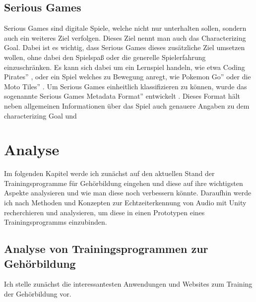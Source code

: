 \section{Serious Games}
Serious Games sind digitale Spiele, welche nicht nur unterhalten sollen, sondern auch ein weiteres Ziel verfolgen. Dieses Ziel nennt man auch das Characterizing Goal. Dabei ist es wichtig, dass Serious Games dieses zusätzliche Ziel umsetzen wollen, ohne dabei den Spielspaß oder die generelle Spielerfahrung einzuschränken. Es kann sich dabei um ein Lernspiel handeln, wie etwa \glqq Coding Pirates'' \cite{coding_game}, oder ein Spiel welches zu Bewegung anregt, wie \glqq Pokemon Go''\cite{althoff2016influence} oder die \glqq Moto Tiles'' \cite{liu2018playful}. Um Serious Games einheitlich klassifizieren zu können, wurde das sogenannte \glqq Serious Games Metadata Format'' entwickelt \cite{gobel2011makes}. Dieses Format hält neben allgemeinen Informationen über das Spiel auch genauere Angaben zu dem characterizing Goal und

\chapter{Analyse}

%
%
Im folgenden Kapitel werde ich zunächst auf den aktuellen Stand der Trainingsprogramme für Gehörbildung eingehen und diese auf ihre wichtigsten Aspekte analysieren und wie man diese noch verbessern könnte. Daraufhin werde ich nach Methoden und Konzepten zur Echtzeiterkennung von Audio mit Unity recherchieren und analysieren, um diese in einen Prototypen eines Trainingsprogramms einzubinden.

\section{Analyse von Trainingsprogrammen zur Gehörbildung}
Ich stelle zunächst die interessantesten Anwendungen und Websites zum Training der Gehörbildung vor.
